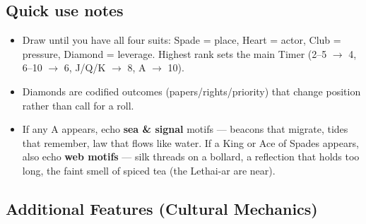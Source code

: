 \subsection*{Quick use notes}
\label{sec:kahfagia-quick-use}

\begin{itemize}
\item Draw until you have all four suits: Spade = place, Heart = actor, Club = pressure, Diamond = leverage. Highest rank sets the main Timer (2--5 $\rightarrow$ 4, 6--10 $\rightarrow$ 6, J/Q/K $\rightarrow$ 8, A $\rightarrow$ 10).
\item Diamonds are codified outcomes (papers/rights/priority) that change position rather than call for a roll.
\item If any A appears, echo \textbf{sea \& signal} motifs --- beacons that migrate, tides that remember, law that flows like water. If a King or Ace of Spades appears, also echo \textbf{web motifs} --- silk threads on a bollard, a reflection that holds too long, the faint smell of spiced tea (the Lethai-ar are near).
\end{itemize}

\subsection*{Additional Features (Cultural Mechanics)}
\label{sec:kahfagia-mechanics}

